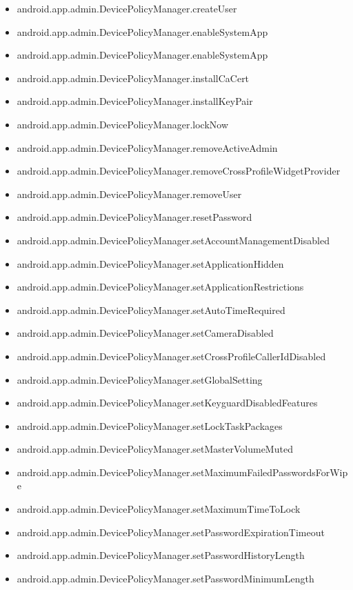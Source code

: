 \documentclass{sig-alternate}
\begin{document}
\begin{itemize}
\item android.app.admin.DevicePolicyManager.createUser
\item android.app.admin.DevicePolicyManager.enableSystemApp
\item android.app.admin.DevicePolicyManager.enableSystemApp
\item android.app.admin.DevicePolicyManager.installCaCert
\item android.app.admin.DevicePolicyManager.installKeyPair
\item android.app.admin.DevicePolicyManager.lockNow
\item android.app.admin.DevicePolicyManager.removeActiveAdmin
\item android.app.admin.DevicePolicyManager.removeCrossProfileWidgetProvider
\item android.app.admin.DevicePolicyManager.removeUser
\item android.app.admin.DevicePolicyManager.resetPassword
\item android.app.admin.DevicePolicyManager.setAccountManagementDisabled
\item android.app.admin.DevicePolicyManager.setApplicationHidden
\item android.app.admin.DevicePolicyManager.setApplicationRestrictions
\item android.app.admin.DevicePolicyManager.setAutoTimeRequired
\item android.app.admin.DevicePolicyManager.setCameraDisabled
\item android.app.admin.DevicePolicyManager.setCrossProfileCallerIdDisabled
\item android.app.admin.DevicePolicyManager.setGlobalSetting
\item android.app.admin.DevicePolicyManager.setKeyguardDisabledFeatures
\item android.app.admin.DevicePolicyManager.setLockTaskPackages
\item android.app.admin.DevicePolicyManager.setMasterVolumeMuted
\item android.app.admin.DevicePolicyManager.setMaximumFailedPasswordsForWipe
\item android.app.admin.DevicePolicyManager.setMaximumTimeToLock
\item android.app.admin.DevicePolicyManager.setPasswordExpirationTimeout
\item android.app.admin.DevicePolicyManager.setPasswordHistoryLength
\item android.app.admin.DevicePolicyManager.setPasswordMinimumLength

\end{itemize}
\end{document}
